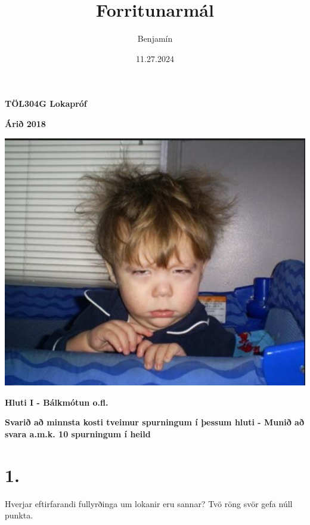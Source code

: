 \documentclass{article}
\title{Forritunarmál}
\author{Benjamín}
\date{11.27.2024}
\begin{document}
\maketitle
\begin{center}

\Huge{\textbf{TÖL304G Lokapróf}}


\LARGE{\textbf{Árið 2018}}


\vspace{5em}

\includegraphics[scale = 0.5]{myndir/bugun.jpg}
\end{center}


\newpage


\begin{center}
    \textbf{Hluti I - Bálkmótun o.fl.}

    \textbf{Svarið að minnsta kosti tveimur spurningum í þessum hluti - Munið að svara a.m.k. 10 spurningum í heild}
\end{center}

\section{1.}

Hverjar eftirfarandi fullyrðinga um lokanir eru sannar? Tvö röng svör gefa núll punkta.
\end{document}

